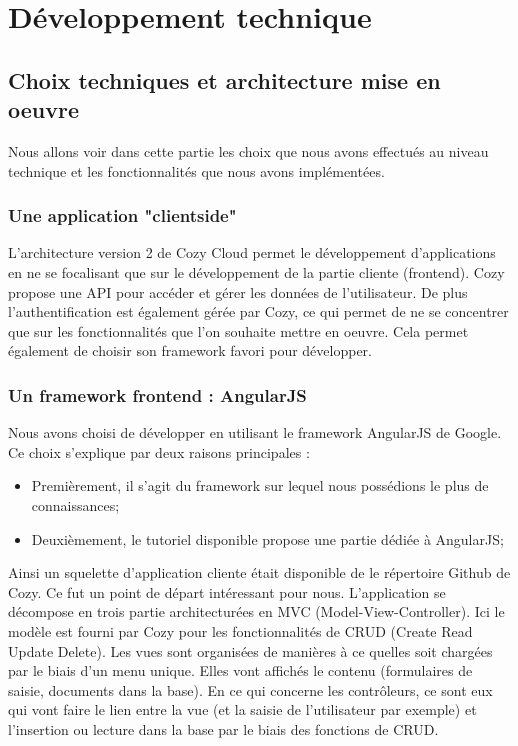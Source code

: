 \chapter{Développement technique}



\section{Choix techniques et architecture mise en oeuvre}

Nous allons voir dans cette partie les choix que nous avons effectués au niveau technique et les fonctionnalités que nous avons implémentées. 
\subsection{Une application "clientside"}

L'architecture version 2 de Cozy Cloud permet le développement d'applications en ne se focalisant que sur le développement de la partie cliente (frontend). Cozy propose une API pour accéder et gérer les données de l'utilisateur. De plus l'authentification est également gérée par Cozy, ce qui permet de ne se concentrer que sur les fonctionnalités que l'on souhaite mettre en oeuvre. Cela permet également de choisir son framework favori pour développer.  

\newpage{}

\subsection{Un framework frontend : AngularJS}

Nous avons choisi de développer en utilisant le framework AngularJS de Google. Ce choix s'explique par deux raisons principales : 

\begin{itemize}
\item Premièrement, il s'agit du framework sur lequel nous possédions le plus de connaissances;
\item Deuxièmement, le tutoriel disponible propose une partie dédiée à AngularJS;
\end{itemize}

Ainsi un squelette d'application cliente était disponible de le répertoire Github de Cozy. Ce fut un point de départ intéressant pour nous. L'application se décompose en trois partie architecturées en MVC (Model-View-Controller). Ici le modèle est fourni par Cozy pour les fonctionnalités de CRUD (Create Read Update Delete). Les vues sont organisées de manières à ce quelles soit chargées par le biais d'un menu unique. Elles vont affichés le contenu (formulaires de saisie, documents dans la base). En ce qui concerne les contrôleurs, ce sont eux qui vont faire le lien entre la vue (et la saisie de l'utilisateur par exemple) et l'insertion ou lecture dans la base par le biais des fonctions de CRUD.  



